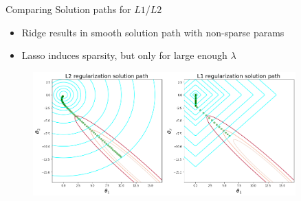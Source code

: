 \documentclass[11pt,compress,t,notes=noshow, xcolor=table]{beamer}
\begin{document}
\begin{vbframe}{Comparing Solution paths for $L1$/$L2$}
\begin{itemize}
    \item Ridge results in  smooth solution path with non-sparse params
    \item Lasso induces sparsity, but only for large enough $\lambda$
\end{itemize}
 \lz
\begin{figure}
\includegraphics[width=0.9\textwidth]{figure_man/solution_paths_l1_l2.png}\\
\end{figure}

\end{vbframe}

 

\end{document}
